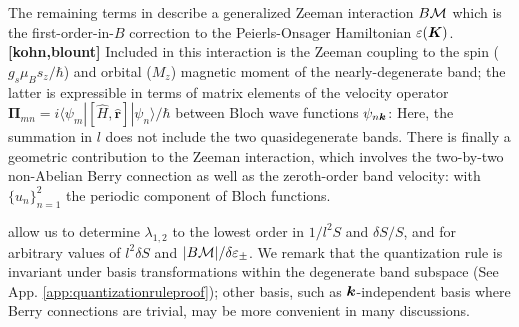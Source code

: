 \documentclass[aps, prb, showpacs, twocolumn, notitlepage, superscriptaddress]{revtex4-1}
\begin{document}
The remaining terms in  describe a generalized Zeeman interaction $B{\cal M}$ which is the first-order-in-$B$ correction to the Peierls-Onsager Hamiltonian $\varepsilon(\boldsymbol{K})$\cite{rotheffham}.\textbf{[kohn,blount]} Included in this interaction is the Zeeman coupling to the spin ($g_s\mu_Bs_z/\hbar$) and orbital ($M_z$) magnetic moment\cite{thonhauser_orbital_2005} of the nearly-degenerate band; the latter is expressible in terms of matrix elements of the velocity operator $\boldsymbol{\Pi}_{mn}=i\langle\psi_m|[\hat{H}, \hat{\boldsymbol{r}}]|\psi_n\rangle/\hbar$ between Bloch wave functions $\psi_{n\boldsymbol{k}}$:
Here, the summation in $l$ does not include the two quasidegenerate bands.  There is finally a geometric contribution to the Zeeman interaction, which involves the two-by-two non-Abelian Berry connection\cite{berry_quantal_1984} as well as the  zeroth-order band velocity: 
with $\{u_n\}_{n=1}^2$ the periodic component of Bloch functions. 

 allow us to determine $\lambda_{1,2}$ to the lowest order  in $1/l^2S$ and $\delta S/S$, and for arbitrary values of $l^2\delta S$ and $|B{\cal M}|/\delta \varepsilon_{\pm}$. We remark that the quantization rule is invariant under basis transformations within the degenerate band subspace (See App. \ref{app:quantizationruleproof}); other basis, such as $\boldsymbol{k}$-independent basis where Berry connections are trivial, may be more convenient in many discussions.

\end{document}
